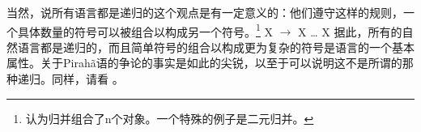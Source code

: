 	
当然，说所有语言都是递归的这个观点是有一定意义的：他们遵守这样的规则，一个具体数量的符号可以被组合以构成另一个符号。\footnote{%
 \citet[]{Chomsky2005a}认为归并组合了n个对象。一个特殊的例子是二元归并。
}
\ea
X $\to$ X \ldots{} X
\z
据此，所有的自然语言都是递归的，而且简单符号的组合以构成更为复杂的符号是语言的一个基本属性\citep[]{Hockett60a}。关于Pirah{\~a}语的争论的事实是如此的尖锐，以至于可以说明这不是所谓的那种递归。同样，请看 \citet{Fitch2010a}。

